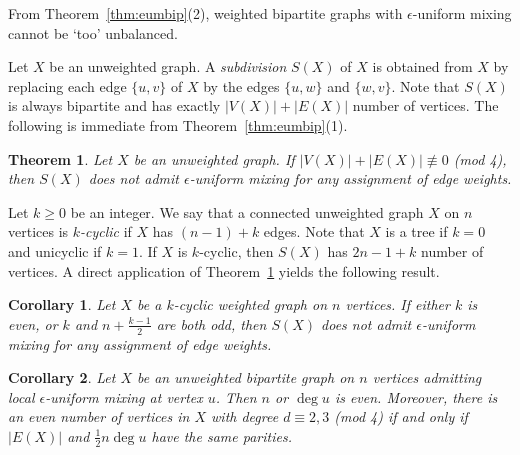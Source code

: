 \documentclass[11pt]{article}
\newtheorem{theorem}{Theorem}
\newtheorem{corollary}{Corollary}
\begin{document}
From Theorem~\ref{thm:eumbip}(2), weighted bipartite graphs with $\epsilon$-uniform mixing cannot be `too' unbalanced.

Let $X$ be an unweighted graph. A \textit{subdivision} $S(X)$ of $X$ is obtained from $X$ by replacing each edge $\{u,v\}$ of $X$ by the edges $\{u,w\}$ and $\{w,v\}$. Note that $S(X)$ is always bipartite and has exactly $|V(X)|+|E(X)|$ number of vertices. The following is immediate from Theorem~\ref{thm:eumbip}(1).

\begin{theorem}
\label{thm:subd}
Let $X$ be an unweighted graph. If $|V(X)|+|E(X)|\not\equiv 0$ (mod 4), then $S(X)$ does not admit $\epsilon$-uniform mixing for any assignment of edge weights.
\end{theorem}

Let $k\geq 0$ be an integer. We say that a connected unweighted graph $X$ on $n$ vertices is \textit{$k$-cyclic} if $X$ has $(n-1)+k$ edges. Note that $X$ is a tree if $k=0$ and unicyclic if $k=1$. 
If $X$ is $k$-cyclic, then $S(X)$ has 
$2n-1+k$ number of vertices. A direct application of Theorem~\ref{thm:subd} yields the following result.

\begin{corollary}
\label{cor:subd}
Let $X$ be a $k$-cyclic weighted graph on $n$ vertices. If either $k$ is even, or $k$ and $n+\frac{k-1}{2}$ are both odd, then $S(X)$ does not admit $\epsilon$-uniform mixing for any assignment of edge weights.
\end{corollary}

\begin{corollary}
\label{nodd}
Let $X$ be an unweighted bipartite graph on $n$ vertices admitting local $\epsilon$-uniform mixing at vertex $u$. Then $n$ or $\operatorname{deg}u$ is even. Moreover, there is an even number of vertices in $X$ with degree $d\equiv 2,3$ (mod 4) if and only if $|E(X)|$ and $\frac{1}{2}n\operatorname{deg}u$ have the same parities.
\end{corollary}
\end{document}
